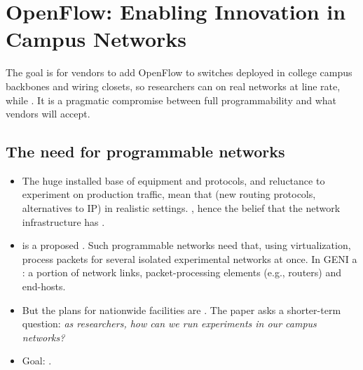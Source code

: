 \chapter{OpenFlow: Enabling Innovation in Campus Networks}\label{sec:openflow}

\begin{keybox}
 The goal is for vendors to add OpenFlow to switches deployed in college campus backbones and wiring closets, so researchers can  on real networks at line rate, while . It is a pragmatic compromise between full programmability and what vendors will accept.
\end{keybox}

\section{The need for programmable networks}
\begin{itemize}
\item The huge installed base of equipment and protocols, and reluctance to experiment on production traffic, mean that  (new routing protocols, alternatives to IP) in realistic settings. , hence the belief that the network infrastructure has .
\item {} is a proposed . Such programmable networks need  that, using virtualization, process packets for several isolated experimental networks at once. In GENI a : a portion of network links, packet-processing elements (e.g., routers) and end-hosts.
\item But the plans for nationwide facilities are . The paper asks a shorter-term question: \emph{as researchers, how can we run experiments in our campus networks?}
\item Goal: .
\end{itemize}

